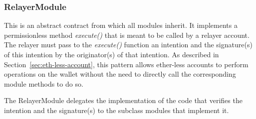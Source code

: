 \documentclass[12pt]{article}
\begin{document}
\subsubsection{RelayerModule}

This is an abstract contract from which all modules inherit. It implements a permissionless method \emph{execute()} that is meant to be called by a relayer account. The relayer must pass to the \emph{execute()} function an intention and the signature(s) of this intention by the originator(s) of that intention. As described in Section~\ref{sec:eth-less-account}, this pattern allows ether-less accounts to perform operations on the wallet without the need to directly call the corresponding module methods to do so.

The RelayerModule delegates the implementation of the code that verifies the intention and the signature(s) to the subclass modules that implement it.
\end{document}
